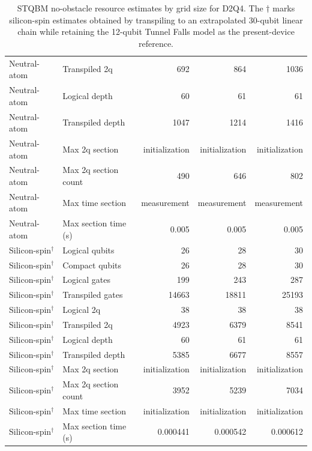 \begin{table}
\begin{tabular}{llrrr}
Neutral-atom & Transpiled 2q & 692 & 864 & 1036 \\
Neutral-atom & Logical depth & 60 & 61 & 61 \\
Neutral-atom & Transpiled depth & 1047 & 1214 & 1416 \\
Neutral-atom & Max 2q section & initialization & initialization & initialization \\
Neutral-atom & Max 2q section count & 490 & 646 & 802 \\
Neutral-atom & Max time section & measurement & measurement & measurement \\
Neutral-atom & Max section time (s) & 0.005 & 0.005 & 0.005 \\
\hline
Silicon-spin$^{\dagger}$ & Logical qubits & 26 & 28 & 30 \\
Silicon-spin$^{\dagger}$ & Compact qubits & 26 & 28 & 30 \\
Silicon-spin$^{\dagger}$ & Logical gates & 199 & 243 & 287 \\
Silicon-spin$^{\dagger}$ & Transpiled gates & 14663 & 18811 & 25193 \\
Silicon-spin$^{\dagger}$ & Logical 2q & 38 & 38 & 38 \\
Silicon-spin$^{\dagger}$ & Transpiled 2q & 4923 & 6379 & 8541 \\
Silicon-spin$^{\dagger}$ & Logical depth & 60 & 61 & 61 \\
Silicon-spin$^{\dagger}$ & Transpiled depth & 5385 & 6677 & 8557 \\
Silicon-spin$^{\dagger}$ & Max 2q section & initialization & initialization & initialization \\
Silicon-spin$^{\dagger}$ & Max 2q section count & 3952 & 5239 & 7034 \\
Silicon-spin$^{\dagger}$ & Max time section & initialization & initialization & initialization \\
Silicon-spin$^{\dagger}$ & Max section time (s) & 0.000441 & 0.000542 & 0.000612 \\
\hline
\end{tabular}
\caption{STQBM no-obstacle resource estimates by grid size for D2Q4. The \(\dagger\) marks silicon-spin estimates obtained by transpiling to an extrapolated 30-qubit linear chain while retaining the 12-qubit Tunnel Falls model as the present-device reference.}
\label{tab:spacetime-qlbm-grid-resources}
\end{table}
